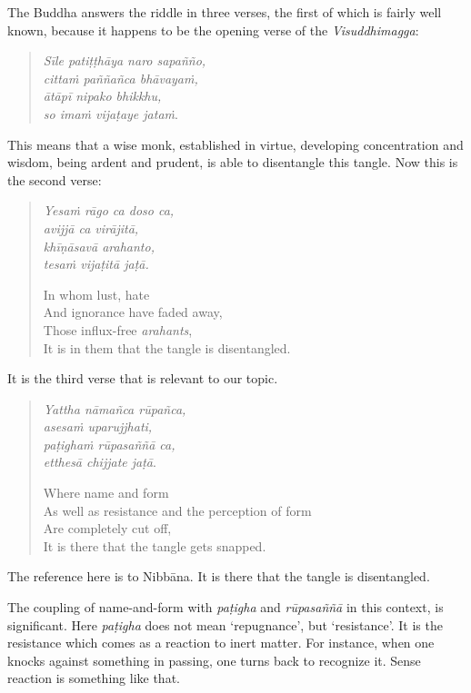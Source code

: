 The Buddha answers the riddle in three verses, the first of which is fairly well known, because it happens to be the opening verse of the \emph{Visuddhimagga}:

\begin{quote}
\emph{Sīle patiṭṭhāya naro sapañño,}\\
\emph{cittaṁ paññañca bhāvayaṁ,}\\
\emph{ātāpī nipako bhikkhu,}\\
\emph{so imaṁ vijaṭaye jataṁ}.
\end{quote}

This means that a wise monk, established in virtue, developing concentration and wisdom, being ardent and prudent, is able to disentangle this tangle. Now this is the second verse:

\clearpage

\begin{quote}
\emph{Yesaṁ rāgo ca doso ca,}\\
\emph{avijjā ca virājitā,}\\
\emph{khīṇāsavā arahanto,}\\
\emph{tesaṁ vijaṭitā jaṭā.}

In whom lust, hate\\
And ignorance have faded away,\\
Those influx-free \emph{arahants},\\
It is in them that the tangle is disentangled.
\end{quote}

It is the third verse that is relevant to our topic.

\begin{quote}
\emph{Yattha nāmañca rūpañca,}\\
\emph{asesaṁ uparujjhati,}\\
\emph{paṭighaṁ rūpasaññā ca,}\\
\emph{etthesā chijjate jaṭā}.

Where name and form\\
As well as resistance and the perception of form\\
Are completely cut off,\\
It is there that the tangle gets snapped.
\end{quote}

The reference here is to Nibbāna. It is there that the tangle is disentangled.

The coupling of name-and-form with \emph{paṭigha} and \emph{rūpasaññā} in this context, is significant. Here \emph{paṭigha} does not mean `repugnance', but `resistance'. It is the resistance which comes as a reaction to inert matter. For instance, when one knocks against something in passing, one turns back to recognize it. Sense reaction is something like that.

